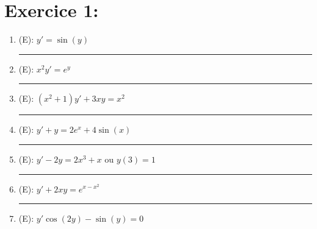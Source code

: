 \documentclass[a4paper,12pt]{article}
\begin{document}
\section{Exercice 1:}
\begin{enumerate}
	\vspace{1cm}
	\item (E): $y' = \sin(y)$ \\
	
	\vspace{1cm}
	\hrule

	\vspace{1cm}
	\item (E): $x^2 y' = e^y$ \\
	
	\vspace{1cm}
	\hrule

	\vspace{1cm}
	\item (E): $(x^2 + 1) y' + 3xy = x^2$ \\
	
	\vspace{1cm}
	\hrule
		
	\vspace{1cm}
	\item (E): $y' + y = 2e^x + 4 \sin(x)$ \\
	
	\vspace{1cm}
	\hrule
	
	\vspace{1cm}
	\item (E): $y' - 2y = 2x^3 + x \text{ ou } y(3)=1$ \\
	
	\vspace{1cm}
	\hrule

	\vspace{1cm}
	\item (E): $y' + 2xy = e^{x-x^2}$
	\vspace{1cm}
	\hrule

	\vspace{1cm}
	\item (E): $y' \cos(2y) - \sin(y) = 0$
	\vspace{1cm}

\end{enumerate}

\end{document}
